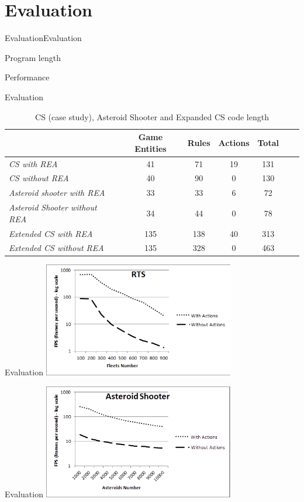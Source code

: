 \documentclass{beamer}
\begin{document}
\section{Evaluation}
\begin{slide}{Evaluation}{Evaluation}{
\item Program length
\item Performance
}\end{slide}

\begin{frame}{Evaluation}
\fontsize{8}{7.2}\selectfont

\center
\begin{table}
\centering
\caption{CS (case study), Asteroid Shooter and Expanded CS code length}
\begin{tabular}
{|l|c|c|c|c|c|c|}
\hline
& Game Entities & Rules & Actions & Total\\
\hline
\textit{CS with REA} & 41 & 71 & 19 & 131\\
\hline
\textit{CS without REA} & 40 & 90 & 0 & 130\\
\hline
\textit{Asteroid shooter with REA} & 33 & 33 & 6 & 72\\
\hline
\textit{Asteroid Shooter without REA} & 34 & 44 & 0 & 78\\
\hline
\textit{Extended CS with REA} & 135 & 138 & 40 & 313\\
\hline
\textit{Extended CS without REA} & 135 & 328 & 0 & 463\\
\hline
\end{tabular}
\end{table}
\end{frame}

\begin{frame}{Evaluation}
\center
\includegraphics[height=5cm]{../RTS.png}
\end{frame}

\begin{frame}{Evaluation}
\center
\includegraphics[height=5cm]{../Shooter.png}
\end{frame}
\end{document}
